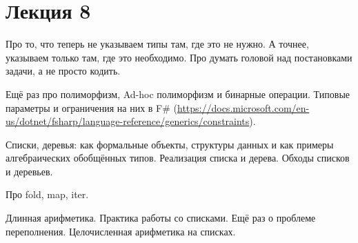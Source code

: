 \section{Лекция 8}
 
    Про то, что теперь не указываем типы там, где это не нужно. А точнее, указываем только там, где это необходимо.
    Про думать головой над постановками задачи, а не просто кодить.


    Ещё раз про полиморфизм, Ad-hoc полиморфизм и бинарные операции. 
    Типовые параметры и ограничения на них в F\# (\url{https://docs.microsoft.com/en-us/dotnet/fsharp/language-reference/generics/constraints}). 
    
    Списки, деревья: как формальные объекты, структуры данных и как примеры алгебраических обобщённых типов. 
    Реализация списка и дерева. 
    Обходы списков и деревьев. 
    
    Про fold, map, iter.

    Длинная арифметика. Практика работы со списками. Ещё раз о проблеме переполнения. Целочисленная арифметика на списках. 
    
